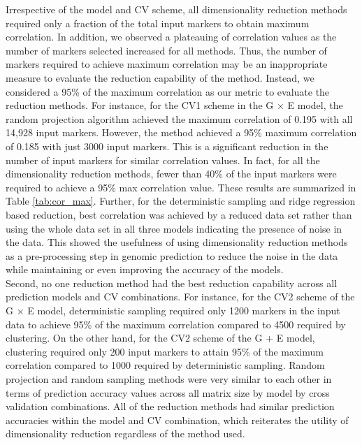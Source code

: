 Irrespective of the model and CV scheme, all dimensionality reduction methods required only a fraction of the total input markers to obtain maximum correlation. In addition, we observed a plateauing of correlation values as the number of markers selected increased for all methods. Thus, the  number of markers required to achieve maximum correlation may be an inappropriate measure to evaluate the reduction capability of the method. Instead, we considered a 95\% of the maximum correlation as our metric to evaluate the reduction methods. For instance, for the CV1 scheme in the G $\times$ E model, the random projection algorithm achieved the maximum correlation of 0.195 with all 14,928 input markers. However, the method achieved a 95\% maximum correlation of 0.185 with just 3000 input markers. This is a significant reduction in the number of input markers for similar correlation values. In fact, for all the dimensionality reduction methods, fewer than 40\% of the input markers were required to achieve a 95\% max correlation value. These results are summarized in Table \ref{tab:cor_max}. Further, for the deterministic sampling and ridge regression based reduction, best correlation was achieved by a reduced data set rather than using the whole data set in all three models indicating the presence of noise in the data. This showed the usefulness of using dimensionality reduction methods as a pre-processing step in genomic prediction to reduce the noise in the data while maintaining or even improving the accuracy of the models. \\

Second, no one reduction method had the best reduction capability across all prediction models and CV combinations. For instance, for the CV2 scheme of the G $\times$ E model, deterministic sampling required only 1200 markers in the input data to achieve 95\% of the maximum correlation compared to 4500 required by clustering. On the other hand, for the CV2 scheme of the G + E model, clustering required only 200 input markers to attain 95\% of the maximum correlation compared to 1000 required by deterministic sampling. Random projection and random sampling methods were very similar to each other in terms of prediction accuracy values across all matrix size by model by cross validation combinations. All of the reduction methods had similar prediction accuracies within the model and CV combination, which reiterates the utility of dimensionality reduction regardless of the method used.



